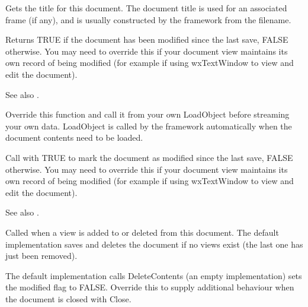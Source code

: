 Gets the title for this document. The document title is used for an associated
frame (if any), and is usually constructed by the framework from
the filename.

\label{wxdocumentismodified}


Returns TRUE if the document has been modified since the last save, FALSE otherwise.
You may need to override this if your document view maintains its own
record of being modified (for example if using wxTextWindow to view and edit the document).

See also .



Override this function and call it from your own LoadObject before
streaming your own data. LoadObject is called by the framework
automatically when the document contents need to be loaded.

\label{wxdocumentmodify}


Call with TRUE to mark the document as modified since the last save, FALSE otherwise.
You may need to override this if your document view maintains its own
record of being modified (for example if using wxTextWindow to view and edit the document).

See also .



Called when a view is added to or deleted from this document. The default
implementation saves and deletes the document if no views exist (the last
one has just been removed).



The default implementation calls DeleteContents (an empty implementation)
sets the modified flag to FALSE. Override this to
supply additional behaviour when the document is closed with Close.


